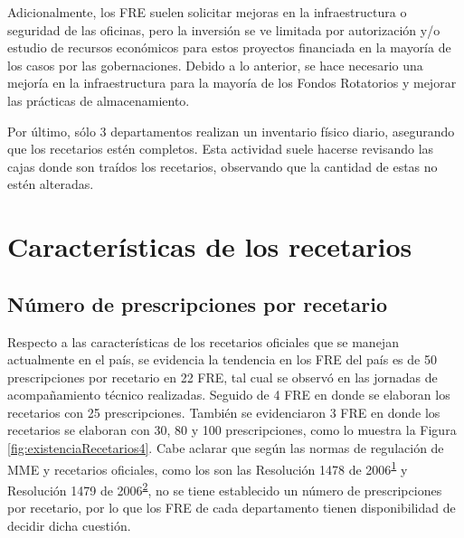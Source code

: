 \documentclass[
  oneside]{book}
\begin{document}
Adicionalmente, los FRE suelen solicitar mejoras en la infraestructura o seguridad de las oficinas, pero la inversión se ve limitada por autorización y/o estudio de recursos económicos para estos proyectos financiada en la mayoría de los casos por las gobernaciones. Debido a lo anterior, se hace necesario una mejoría en la infraestructura para la mayoría de los Fondos Rotatorios y mejorar las prácticas de almacenamiento.

Por último, sólo 3 departamentos realizan un inventario físico diario, asegurando que los recetarios estén completos. Esta actividad suele hacerse revisando las cajas donde son traídos los recetarios, observando que la cantidad de estas no estén alteradas.

\hypertarget{caracteruxedsticas-de-los-recetarios}{%
\section{Características de los recetarios}\label{caracteruxedsticas-de-los-recetarios}}


\hypertarget{nuxfamero-de-prescripciones-por-recetario}{%
\subsection{Número de prescripciones por recetario}\label{nuxfamero-de-prescripciones-por-recetario}}

Respecto a las características de los recetarios oficiales que se manejan actualmente en el país, se evidencia la tendencia en los FRE del país es de 50 prescripciones por recetario en 22 FRE, tal cual se observó en las jornadas de acompañamiento técnico realizadas. Seguido de 4 FRE en donde se elaboran los recetarios con 25 prescripciones. También se evidenciaron 3 FRE en donde los recetarios se elaboran con 30, 80 y 100 prescripciones, como lo muestra la Figura \ref{fig:existenciaRecetarios4}. Cabe aclarar que según las normas de regulación de MME y recetarios oficiales, como los son las Resolución 1478 de 2006\textsuperscript{\protect\hyperlink{ref-MSPS1478-2006}{1}} y Resolución 1479 de 2006\textsuperscript{\protect\hyperlink{ref-MSPS1479-2006}{2}}, no se tiene establecido un número de prescripciones por recetario, por lo que los FRE de cada departamento tienen disponibilidad de decidir dicha cuestión.
\end{document}

